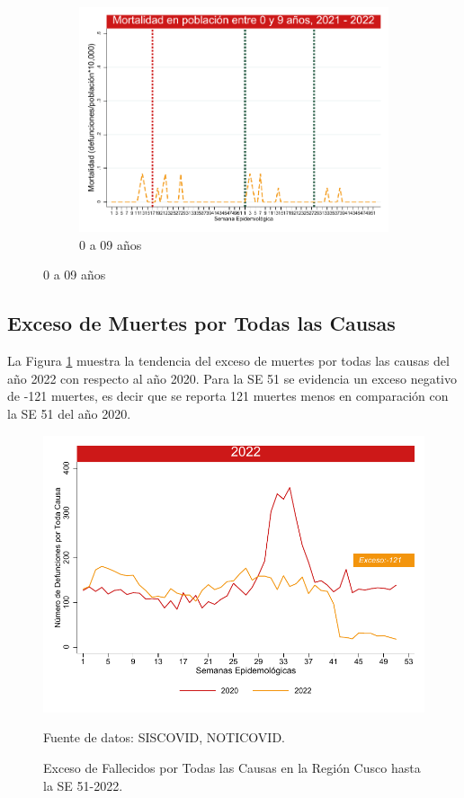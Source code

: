 \documentclass[12pt,a4paper,openany]{book}
\begin{document}
\begin{figure}[h]
		\vspace{10mm}
		\begin{subfigure}[b]{0.45\textwidth}
			\centering
			\includegraphics[width=\textwidth]{../figuras/mortalidad_edad_0.pdf}
			\caption{0 a 09 años}
		\end{subfigure}
	\end{figure}
	\clearpage	
	\subsection*{Exceso de Muertes por Todas las Causas}
	\noindent La Figura \ref{fig:exceso_regional} muestra la tendencia del exceso de muertes por todas las causas del año 2022 con respecto al año 2020.  Para la SE 51 se evidencia un exceso negativo de -121 muertes, es decir que se reporta 121 muertes menos en comparación con la SE 51 del año 2020.
	
		
	\begin{figure}[h]
		\caption{Exceso de Fallecidos por Todas las Causas en la Región Cusco hasta la SE 51-2022.}\label{fig:exceso_regional}
		\begin{center}
			\includegraphics[width=0.85\linewidth]{../figuras/exceso_region_2022.pdf}
		\end{center}
		{\footnotesize {Fuente de datos: SISCOVID, NOTICOVID.}}
	\end{figure}
	\clearpage
	
\end{document}

